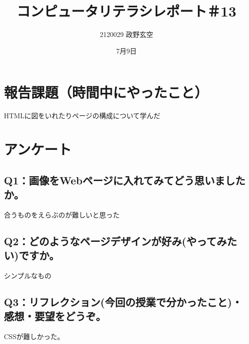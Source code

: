 \documentclass[12pt,a4j]{jarticle}
\begin{document}
\title{コンピュータリテラシレポート＃13}
\author{2120029 政野玄空}
\date{7月9日}
\maketitle

\section{報告課題（時間中にやったこと）}
HTMLに図をいれたりページの構成について学んだ

\section{アンケート}

\subsection{Q1：画像をWebページに入れてみてどう思いましたか。}
合うものをえらぶのが難しいと思った

\subsection{Q2：どのようなページデザインが好み(やってみたい)ですか。}
シンプルなもの

\subsection{Q3：リフレクション(今回の授業で分かったこと)・感想・要望をどうぞ。}
CSSが難しかった。
\end{document}
